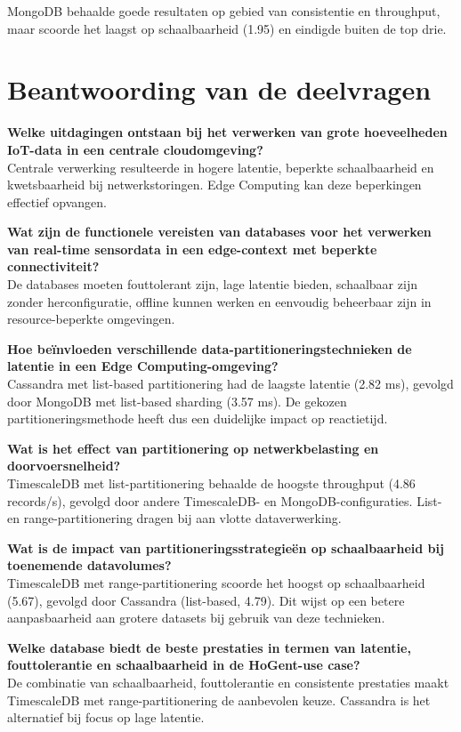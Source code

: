 MongoDB behaalde goede resultaten op gebied van consistentie en throughput, maar scoorde het laagst op schaalbaarheid (1.95) en eindigde buiten de top drie.

\section{Beantwoording van de deelvragen}

\textbf{Welke uitdagingen ontstaan bij het verwerken van grote hoeveelheden IoT-data in een centrale cloudomgeving?} \\
Centrale verwerking resulteerde in hogere latentie, beperkte schaalbaarheid en kwetsbaarheid bij netwerkstoringen. Edge Computing kan deze beperkingen effectief opvangen.

\textbf{Wat zijn de functionele vereisten van databases voor het verwerken van real-time sensordata in een edge-context met beperkte connectiviteit?} \\
De databases moeten fouttolerant zijn, lage latentie bieden, schaalbaar zijn zonder herconfiguratie, offline kunnen werken en eenvoudig beheerbaar zijn in resource-beperkte omgevingen.

\textbf{Hoe beïnvloeden verschillende data-partitioneringstechnieken de latentie in een Edge Computing-omgeving?} \\
Cassandra met list-based partitionering had de laagste latentie (2.82 ms), gevolgd door MongoDB met list-based sharding (3.57 ms). De gekozen partitioneringsmethode heeft dus een duidelijke impact op reactietijd.

\textbf{Wat is het effect van partitionering op netwerkbelasting en doorvoersnelheid?} \\
TimescaleDB met list-partitionering behaalde de hoogste throughput (4.86 records/s), gevolgd door andere TimescaleDB- en MongoDB-configuraties. List- en range-partitionering dragen bij aan vlotte dataverwerking.

\textbf{Wat is de impact van partitioneringsstrategieën op schaalbaarheid bij toenemende datavolumes?} \\
TimescaleDB met range-partitionering scoorde het hoogst op schaalbaarheid (5.67), gevolgd door Cassandra (list-based, 4.79). Dit wijst op een betere aanpasbaarheid aan grotere datasets bij gebruik van deze technieken.

\textbf{Welke database biedt de beste prestaties in termen van latentie, fouttolerantie en schaalbaarheid in de HoGent-use case?} \\
De combinatie van schaalbaarheid, fouttolerantie en consistente prestaties maakt TimescaleDB met range-partitionering de aanbevolen keuze. Cassandra is het alternatief bij focus op lage latentie.


